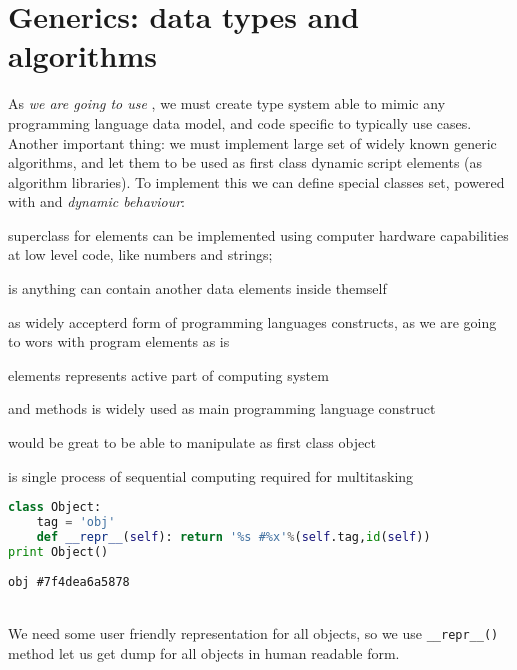 \chapter{Generics: data types and algorithms}\clearpage

As \emph{we are going to use }, we must create type
system able to mimic any programming language data model, and 
code specific to typically use cases. Another important thing: we must implement
large set of widely known generic algorithms, and let them to be used as
first class dynamic script elements (as algorithm libraries).
To implement this we can define special classes set, powered with
 and \emph{dynamic behaviour}:
\begin{description}[nosep]
\item[Primitive] superclass for elements can be implemented using
computer hardware capabilities at low level code, like numbers and strings;
\item[Collection] is anything can contain another data elements inside themself
\item[AST] as widely accepterd form of programming languages constructs, as
we are going to wors with program elements as is
\item[Active] elements represents active part of computing system
\item[Function] and methods is widely used as main programming language
construct
\item[Algorithm] would be great to be able to manipulate as first class object
\item[Thread] is single process of sequential computing required for
multitasking
\end{description}



\begin{lstlisting}[language=Python]
class Object:
    tag = 'obj'
    def __repr__(self): return '%s #%x'%(self.tag,id(self))
print Object()
\end{lstlisting}
\begin{lstlisting}
obj #7f4dea6a5878
\end{lstlisting}
\\We need some user friendly representation for all objects, so we use
\verb|__repr__()| method let us get dump for all objects in human readable form.

